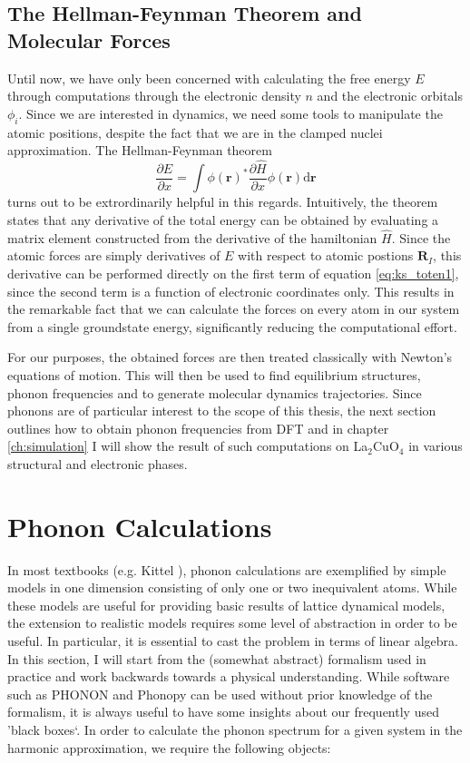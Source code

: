 \subsection{The Hellman-Feynman Theorem and Molecular Forces}
Until now, we have only been concerned with calculating the free energy $E$ through computations through the electronic density $n$ and the electronic orbitals $\phi_i$. Since we are interested in dynamics, we need some tools to manipulate the atomic positions, despite the fact that we are in the clamped nuclei approximation. The Hellman-Feynman theorem \cite{Feynman1939}
%
\[ \frac{\partial E}{\partial x} = \int \phi(\bm{r})^* \frac{\partial \hat{H}}{\partial x} \phi(\bm{r}) \mathrm{d}\bm{r} \]
%
turns out to be extrordinarily helpful in this regards. Intuitively, the theorem states that any derivative of the total energy can be obtained by evaluating a matrix element constructed from the derivative of the hamiltonian $\hat{H}$. Since the atomic forces are simply derivatives of $E$ with respect to atomic postions $\bm{R}_I$, this derivative can be performed directly on the first term of equation \eqref{eq:ks_toten1}, since the second term is a function of electronic coordinates only. This results in the remarkable fact that we can calculate the forces on every atom in our system from a single groundstate energy, significantly reducing the computational effort.

For our purposes, the obtained forces are then treated classically with Newton's equations of motion. This will then be used to find equilibrium structures, phonon frequencies and to generate molecular dynamics trajectories. Since phonons are of particular interest to the scope of this thesis, the next section outlines how to obtain phonon frequencies from DFT and in chapter \ref{ch:simulation} I will show the result of such computations on La$_2$CuO$_4$ in various structural and electronic phases.

\section{Phonon Calculations}\label{sec:phonon_calc}
In most textbooks (e.g. Kittel \cite{Kittel2005}), phonon calculations are exemplified by simple models in one dimension consisting of only one or two inequivalent atoms. While these models are useful for providing basic results of lattice dynamical models, the extension to realistic models requires some level of abstraction in order to be useful. In particular, it is essential to cast the problem in terms of linear algebra. In this section, I will start from the (somewhat abstract) formalism used in practice and work backwards towards a physical understanding. While software such as PHONON \cite{Parlinski1997} and Phonopy \cite{Togo2015} can be used without prior knowledge of the formalism, it is always useful to have some insights about our frequently used 'black boxes`. In order to calculate the phonon spectrum for a given system in the harmonic approximation, we require the following objects:

